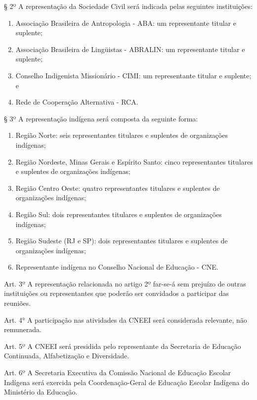 \documentclass[
]{book}
\begin{document}
§ 2º A representação da Sociedade Civil será indicada pelas seguintes instituições:

\begin{enumerate}
\def\labelenumi{\alph{enumi})}
\item
  Associação Brasileira de Antropologia - ABA: um representante titular e suplente;
\item
  Associação Brasileira de Lingüistas - ABRALIN: um representante titular e suplente;
\item
  Conselho Indigenista Missionário - CIMI: um representante titular e suplente; e
\item
  Rede de Cooperação Alternativa - RCA.
\end{enumerate}

§ 3º A representação indígena será composta da seguinte forma:

\begin{enumerate}
\def\labelenumi{\alph{enumi})}
\item
  Região Norte: seis representantes titulares e suplentes de organizações indígenas;
\item
  Região Nordeste, Minas Gerais e Espírito Santo: cinco representantes titulares e suplentes de organizações indígenas;
\item
  Região Centro Oeste: quatro representantes titulares e suplentes de organizações indígenas;
\item
  Região Sul: dois representantes titulares e suplentes de organizações indígenas;
\item
  Região Sudeste (RJ e SP): dois representantes titulares e suplentes de organizações indígenas;
\item
  Representante indígena no Conselho Nacional de Educação - CNE.
\end{enumerate}

Art. 3º A representação relacionada no artigo 2º far-se-á sem prejuízo de outras instituições ou representantes que poderão ser convidados a participar das reuniões.

Art. 4° A participação nas atividades da CNEEI será considerada relevante, não remunerada.

Art. 5º A CNEEI será presidida pelo representante da Secretaria de Educação Continuada, Alfabetização e Diversidade.

Art. 6º A Secretaria Executiva da Comissão Nacional de Educação Escolar Indígena será exercida pela Coordenação-Geral de Educação Escolar Indígena do Ministério da Educação.
\end{document}
